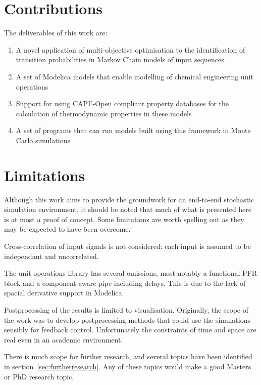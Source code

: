 \section{Contributions}
The deliverables of this work are:
\begin{enumerate}
\item A novel application of multi-objective optimisation to the identification of transition probabilities in Markov Chain models of input sequences.
\item A set of Modelica models that enable modelling of chemical engineering unit operations
\item Support for using CAPE-Open compliant property databases for the calculation of thermodynamic properties in these models
\item A set of programs that can run models built using this framework in Monte Carlo simulations
\end{enumerate}

\section{Limitations}
Although this work aims to provide the groundwork for an end-to-end stochastic simulation environment, it should be noted that much of what is presented here is at most a proof of concept.
Some limitations are worth spelling out as they may be expected to have been overcome.

Cross-correlation of input signals is not considered: each input is assumed to be independant and uncorrelated.

The unit operations library has several omissions, most notably a functional PFR block and a component-aware pipe including delays.  
This is due to the lack of spacial derivative support in Modelica.

Postprocessing of the results is limited to visualisation.
Originally, the scope of the work was to develop postprocessing methods that could use the simulations sensibly for feedback control.
Unfortunately the constraints of time and space are real even in an academic environment.

There is much scope for further research, and several topics have been identified in section~\ref{sec:furtherresearch}.
Any of these topics would make a good Masters or PhD research topic.

